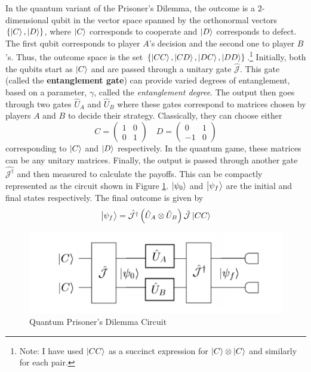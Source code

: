 \documentclass{article}
\theoremstyle{definition}
\begin{document}
In the quantum variant of the Prisoner's Dilemma, the outcome is a $2$-dimensional qubit in the vector space spanned by the orthonormal vectors $\{ \ket{C}, \ket{D} \}$, where $\ket{C}$ corresponds to cooperate and $\ket{D}$ corresponds to defect. The first qubit corresponds to player $A$'s decision and the second one to player $B$'s. Thus, the outcome space is the set $\{ \ket{CC}, \ket{CD}, \ket{DC}, \ket{DD}\}$.\footnote{Note: I have used $\ket{CC}$ as a succinct expression for $\ket{C} \otimes \ket{C}$ and similarly for each pair.} Initially, both the qubits start as $\ket{C}$ and are passed through a unitary gate $\hat{\mathcal{J}}$. This gate (called the \textbf{entanglement gate}) can provide varied degrees of entanglement, based on a parameter, $\gamma$, called the \textit{entanglement degree}. The output then goes through two gates $\hat{U}_A$ and $\hat{U}_B$ where these gates correspond to matrices chosen by players $A$ and $B$ to decide their strategy. Classically, they can choose either 
\[
    C = 
    \begin{pmatrix}
    1 & 0 \\
    0 & 1
    \end{pmatrix} \quad 
    D = 
    \begin{pmatrix}
    0 & 1 \\
    -1 & 0
    \end{pmatrix}
\]
corresponding to $\ket{C}$ and $\ket{D}$ respectively. In the quantum game, these matrices can be any unitary matrices. Finally, the output is passed through another gate $\hat{\mathcal{J}^{\dagger}}$ and then measured to calculate the payoffs. This can be compactly represented as the circuit shown in Figure \ref{fig:qpd}. $\ket{\psi_0}$ and $\ket{\psi_f}$ are the initial and final states respectively. The final outcome is given by
\[
    \ket{\psi_f} = \hat{\mathcal{J}^{\dagger}}\left( \hat{U}_A \otimes \hat{U}_B \right) \hat{\mathcal{J}} \ket{CC}
\]

\begin{figure}[h!]
    \centering
    \includegraphics[scale=0.5]{qpd.png}
    \caption{Quantum Prisoner's Dilemma Circuit}
    \label{fig:qpd}
\end{figure}
\medskip
\end{document}
